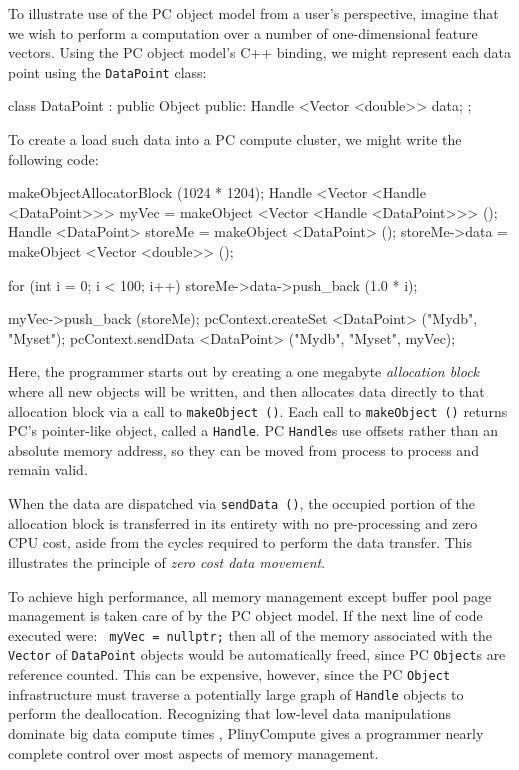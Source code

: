 To illustrate use of the PC object model from a user's perspective,
imagine that we wish to perform a computation over a number of one-dimensional feature vectors.  
Using the PC object model's C++ binding, we might represent each data point using the 
\texttt{DataPoint} class:

\begin{codesmall}
class DataPoint : public Object {
public:
	Handle <Vector <double>> data;
};
\end{codesmall}

\noindent
To create a load such data into a PC compute cluster, we might write the following code:

\begin{codesmall}
makeObjectAllocatorBlock (1024 * 1204);
Handle <Vector <Handle <DataPoint>>> myVec = 
     makeObject <Vector <Handle <DataPoint>>> ();
Handle <DataPoint> storeMe = makeObject <DataPoint> ();
storeMe->data = makeObject <Vector <double>> ();

for (int i = 0; i < 100; i++) 
     storeMe->data->push_back (1.0 * i);

myVec->push_back (storeMe);
pcContext.createSet <DataPoint> ("Mydb", "Myset");
pcContext.sendData <DataPoint> ("Mydb", "Myset", myVec);
\end{codesmall}

\noindent
Here, the programmer starts out by creating a one megabyte \emph{allocation block} where all new objects will be written,
and then allocates data directly to that allocation block via a call to \texttt{makeObject ()}.  Each call to  \texttt{makeObject ()}
returns PC's pointer-like object, called a \texttt{Handle}.  PC \texttt{Handle}s use offsets rather than an absolute memory
address, so they can be moved from process to process and remain valid.  

When the data are dispatched via \texttt{sendData ()},
the occupied
portion of the allocation block is transferred in its entirety with
no pre-processing and zero CPU cost, aside from the cycles required to perform the data transfer.  
This illustrates the principle of \emph{zero cost data movement}.

To achieve high performance, all memory management except buffer pool
page management is taken care of by the PC object model.
If the next line of code executed were:
\texttt{
myVec = nullptr;}
then all of the memory associated with the \texttt{Vector} of \texttt{DataPoint} objects would be automatically
freed, since PC \texttt{Object}s are reference counted.  This can
be expensive, however, since the PC \texttt{Object} infrastructure must traverse a potentially large graph of \texttt{Handle} objects to perform the deallocation.  
Recognizing that low-level data manipulations dominate big data
compute times \cite{ousterhout2015making, shi2015clash}, PlinyCompute gives a programmer nearly complete control
over most aspects of memory management.

